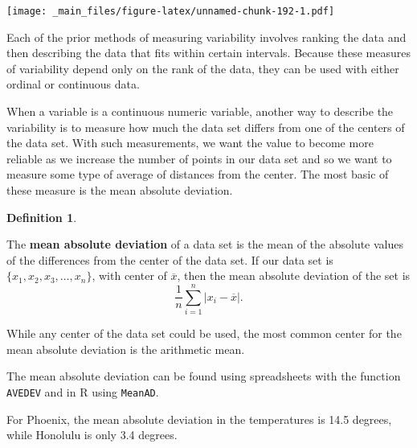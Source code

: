 \documentclass[
]{book}
\theoremstyle{definition}
\newtheorem{definition}{Definition}[chapter]
\theoremstyle{definition}
\theoremstyle{definition}
\theoremstyle{definition}
\theoremstyle{remark}
\begin{document}
\texttt{[image: \_main\_files/figure-latex/unnamed-chunk-192-1.pdf]}

Each of the prior methods of measuring variability involves ranking the data and then describing the data that fits within certain intervals. Because these measures of variability depend only on the rank of the data, they can be used with either ordinal or continuous data.

When a variable is a continuous numeric variable, another way to describe the variability is to measure how much the data set differs from one of the centers of the data set. With such measurements, we want the value to become more reliable as we increase the number of points in our data set and so we want to measure some type of average of distances from the center. The most basic of these measure is the mean absolute deviation.

\begin{definition}
\protect\hypertarget{def:unlabeled-div-300}{}\label{def:unlabeled-div-300}

The \textbf{mean absolute deviation} of a data set is the mean of the absolute values of the differences from the center of the data set. If our data set is \(\{x_1, x_2, x_3, \ldots, x_n\}\), with center of \(\overline{x}\), then the mean absolute deviation of the set is
\[\frac{1}{n} \sum_{i=1}^n |x_i-\overline{x}|.\]

While any center of the data set could be used, the most common center for the mean absolute deviation is the arithmetic mean.

\end{definition}

The mean absolute deviation can be found using spreadsheets with the function \texttt{AVEDEV} and in R using \texttt{MeanAD}.

For Phoenix, the mean absolute deviation in the temperatures is 14.5 degrees, while Honolulu is only 3.4 degrees.
\end{document}
